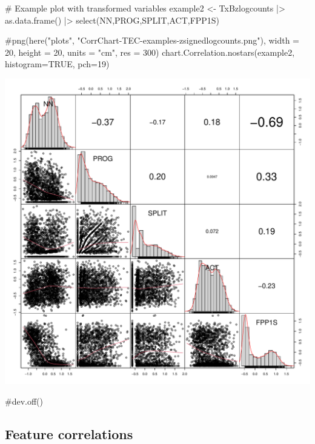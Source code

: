 \documentclass[
  letterpaper,
  DIV=11,
  numbers=noendperiod]{scrreprt}
\newenvironment{Shaded}{\begin{snugshade}}{\end{snugshade}}
\newcommand{\AttributeTok}[1]{\textcolor[rgb]{0.40,0.45,0.13}{#1}}
\newcommand{\CommentTok}[1]{\textcolor[rgb]{0.37,0.37,0.37}{#1}}
\newcommand{\ConstantTok}[1]{\textcolor[rgb]{0.56,0.35,0.01}{#1}}
\newcommand{\DecValTok}[1]{\textcolor[rgb]{0.68,0.00,0.00}{#1}}
\newcommand{\FunctionTok}[1]{\textcolor[rgb]{0.28,0.35,0.67}{#1}}
\newcommand{\NormalTok}[1]{\textcolor[rgb]{0.00,0.23,0.31}{#1}}
\newcommand{\OtherTok}[1]{\textcolor[rgb]{0.00,0.23,0.31}{#1}}
\newcommand{\SpecialCharTok}[1]{\textcolor[rgb]{0.37,0.37,0.37}{#1}}
\begin{document}
\begin{Shaded}
\begin{Highlighting}[]
\CommentTok{\# Example plot with transformed variables}
\NormalTok{example2 }\OtherTok{\textless{}{-}}\NormalTok{ TxBzlogcounts }\SpecialCharTok{|\textgreater{}} 
  \FunctionTok{as.data.frame}\NormalTok{() }\SpecialCharTok{|\textgreater{}}  
  \FunctionTok{select}\NormalTok{(NN,PROG,SPLIT,ACT,FPP1S)}

\CommentTok{\#png(here("plots", "CorrChart{-}TEC{-}examples{-}zsignedlogcounts.png"), width = 20, height = 20, units = "cm", res = 300)}
\FunctionTok{chart.Correlation.nostars}\NormalTok{(example2, }\AttributeTok{histogram=}\ConstantTok{TRUE}\NormalTok{, }\AttributeTok{pch=}\DecValTok{19}\NormalTok{)}
\end{Highlighting}
\end{Shaded}

\includegraphics{D_Ch6_DataPrep_files/figure-pdf/example-correlation-plots2-1.pdf}

\begin{Shaded}
\begin{Highlighting}[]
\CommentTok{\#dev.off()}
\end{Highlighting}
\end{Shaded}

\subsection{Feature correlations}\label{feature-correlations}
\end{document}
